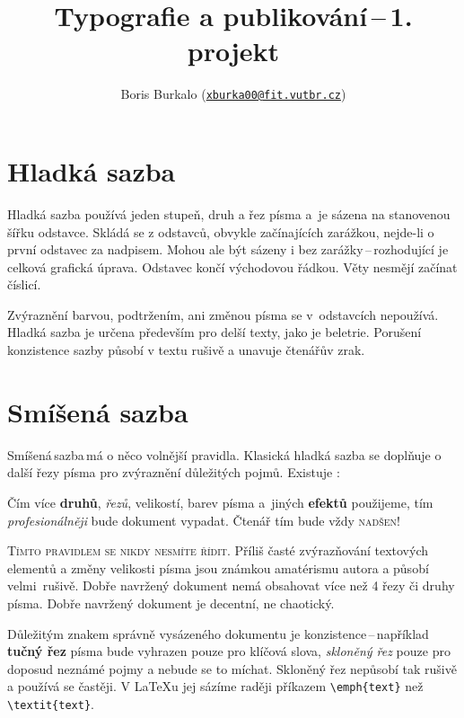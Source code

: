 \documentclass[twocolumn, 10pt, a4paper]{article}
\title{Typografie a publikování\,--\,1. projekt\vspace{6pt}}
\author{Boris Burkalo (\href{mailto:xburka00@fit.vutbr.cz}{\texttt{xburka00@fit.vutbr.cz}})}
\date{}
\begin{document}
\maketitle
\section{Hladká sazba}


Hladká sazba používá jeden stupeň, druh a řez písma a~je sázena na stanovenou šířku odstavce. Skládá se z odstavců, obvykle začínajících zarážkou, nejde-li o první odstavec za nadpisem. Mohou ale být sázeny i bez zarážky\,--\,rozhodující je celková grafická úprava. Odstavec končí východovou řádkou. Věty nesmějí začínat číslicí.

Zvýraznění barvou, podtržením, ani změnou písma se v~odstavcích nepoužívá. Hladká sazba je určena především pro delší texty, jako je beletrie. Porušení konzistence sazby působí v textu rušivě a unavuje čtenářův zrak.

\section{Smíšená sazba}
\label{2}

Smíšená\,sazba\,má o něco volnější pravidla. Klasická hladká sazba se doplňuje o další řezy písma pro zvýraznění dů\-le\-ži\-tých pojmů. Existuje :
\vspace{6pt}

\begin{adjustwidth}{0.7cm}{0.7cm}
Čím více
\textbf{druhů}, \textit{řezů}, {\footnotesize velikostí}, barev písma a~{\sf ji\-ných} {\sf\textbf{{\tiny efektů}}} použijeme, tím \textit{profesionálněji} bude dokument vypadat. Čtenář tím {\large bude} {\LARGE vždy} \textsc{\Huge nadšen!}
\end{adjustwidth}
\vspace{6pt}

\indent
\textsc{Tímto pravidlem se nikdy nesmíte řídit.} Příliš časté zvýrazňování textových elementů a změny velikosti písma jsou známkou amatérismu autora a působí velmi~ru\-ši\-vě. Dobře navržený dokument nemá obsahovat více než 4 řezy či druhy písma. Dobře navržený dokument je decentní, ne chaotický.

Důležitým znakem správně vysázeného dokumentu je konzistence\,--\,například \textbf{tučný řez} písma bude vyhrazen pouze pro klíčová slova, \textit{skloněný řez} pouze pro doposud neznámé pojmy a nebude se to míchat. Skloněný řez ne\-pů\-so\-bí tak rušivě a používá se častěji. V \LaTeX u jej sázíme raději příkazem \verb=\emph{text}= než \verb=\textit{text}=.
\end{document}

